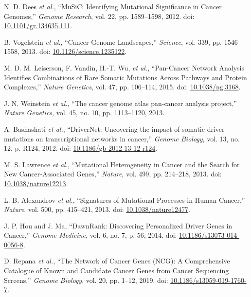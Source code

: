 \documentclass[conference]{IEEEtran}
\begin{document}
	\begin{thebibliography}{99}


N. D. Dees \textit{et al.}, ``MuSiC: Identifying Mutational Significance in Cancer Genomes,'' \textit{Genome Research}, vol. 22, pp. 1589–1598, 2012. doi: \url{10.1101/gr.134635.111}.

B. Vogelstein \textit{et al.}, ``Cancer Genome Landscapes,'' \textit{Science}, vol. 339, pp. 1546–1558, 2013. doi: \url{10.1126/science.1235122}.

M. D. M. Leiserson, F. Vandin, H.-T. Wu, \textit{et al.}, ``Pan-Cancer Network Analysis Identifies Combinations of Rare Somatic Mutations Across Pathways and Protein Complexes,'' \textit{Nature Genetics}, vol. 47, pp. 106–114, 2015. doi: \url{10.1038/ng.3168}.

J. N. Weinstein \textit{et al.}, ``The cancer genome atlas pan-cancer analysis project,'' \textit{Nature Genetics}, vol. 45, no. 10, pp. 1113–1120, 2013.

A. Bashashati \textit{et al.}, ``DriverNet: Uncovering the impact of somatic driver mutations on transcriptional networks in cancer,'' \textit{Genome Biology}, vol. 13, no. 12, p. R124, 2012. doi: \url{10.1186/gb-2012-13-12-r124}.



M. S. Lawrence \textit{et al.}, ``Mutational Heterogeneity in Cancer and the Search for New Cancer-Associated Genes,'' \textit{Nature}, vol. 499, pp. 214–218, 2013. doi: \url{10.1038/nature12213}.

L. B. Alexandrov \textit{et al.}, ``Signatures of Mutational Processes in Human Cancer,'' \textit{Nature}, vol. 500, pp. 415–421, 2013. doi: \url{10.1038/nature12477}.

J. P. Hou and J. Ma, ``DawnRank: Discovering Personalized Driver Genes in Cancer,'' \textit{Genome Medicine}, vol. 6, no. 7, p. 56, 2014. doi: \url{10.1186/s13073-014-0056-8}.

D. Repana \textit{et al.}, ``The Network of Cancer Genes (NCG): A Comprehensive Catalogue of Known and Candidate Cancer Genes from Cancer Sequencing Screens,'' \textit{Genome Biology}, vol. 20, pp. 1–12, 2019. doi: \url{10.1186/s13059-019-1760-7}.


\end{thebibliography}
\end{document}
